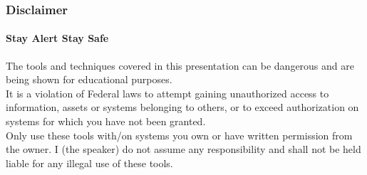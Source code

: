 \documentclass[aspectratio=169]{beamer}
\begin{document}
\begin{frame}
  \frametitle{Disclaimer}
  \framesubtitle{Stay Alert Stay Safe}
  \begin{tcolorbox}[title=disclaimer.log,colback=gray]
    The tools and techniques covered in this presentation can be dangerous and are\\
    being shown for educational purposes.\\
    \newline
    It is a violation of Federal laws to attempt gaining unauthorized access to information, assets or systems belonging to others, or to exceed authorization on systems for which you have not been granted.\\
    \newline
    Only use these tools with/on systems you own or have written permission from the owner. I (the speaker) do not assume any responsibility and shall not be held liable for any illegal use of these tools.\\
  \end{tcolorbox}
\end{frame}
\end{document}
